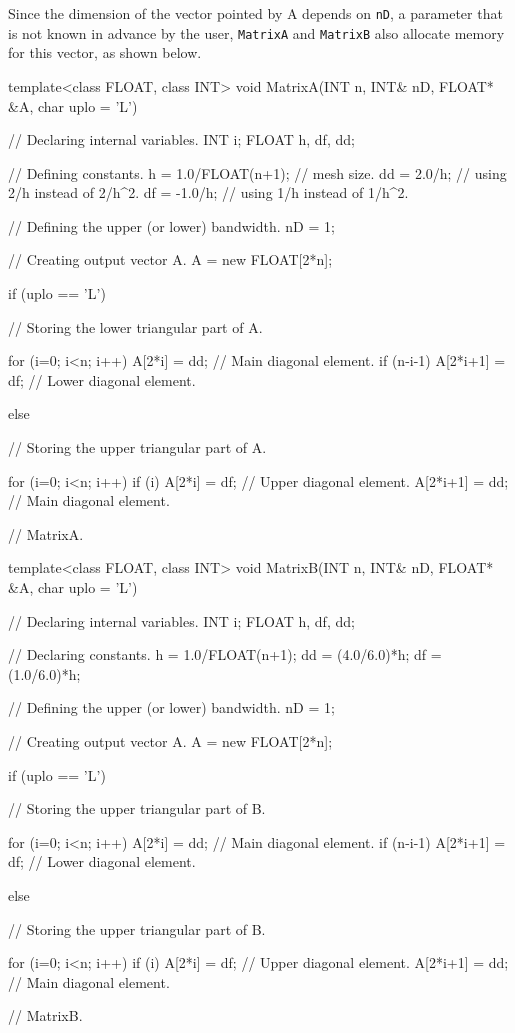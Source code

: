 Since the dimension of the vector pointed by A depends on \texttt{nD}, a parameter that is not known in advance by the user, \texttt{MatrixA} and \texttt{MatrixB} also allocate memory for this vector, as shown below.

\begin{cppcode}
template<class FLOAT, class INT>
void MatrixA(INT n, INT& nD, FLOAT* &A, char uplo = 'L')
{
	// Declaring internal variables.
	INT    i;
	FLOAT  h, df, dd;
	
	// Defining constants.
	h  = 1.0/FLOAT(n+1);   // mesh size.
	dd = 2.0/h;            // using 2/h instead of 2/h^2.
	df = -1.0/h;           // using 1/h instead of 1/h^2.
	
	// Defining the upper (or lower) bandwidth.
	nD  = 1;
	
	// Creating output vector A.
	A   = new FLOAT[2*n];
	
	if (uplo == 'L') {   // Storing the lower triangular part of A.
		
		for (i=0; i<n; i++) {
			A[2*i] = dd;                // Main diagonal element.
			if (n-i-1) A[2*i+1] = df;   // Lower diagonal element.
		}
	}
	else {               // Storing the upper triangular part of A.
		
		for (i=0; i<n; i++) {
			if (i) A[2*i]  = df;        // Upper diagonal element.
			A[2*i+1] = dd;              // Main diagonal element.
		}
	}
} // MatrixA.

template<class FLOAT, class INT>
void MatrixB(INT n, INT& nD, FLOAT* &A, char uplo = 'L')
{
	// Declaring internal variables.
	INT    i;
	FLOAT  h, df, dd;
	
	// Declaring constants.
	h  = 1.0/FLOAT(n+1);
	dd = (4.0/6.0)*h;
	df = (1.0/6.0)*h;
	
	// Defining the upper (or lower) bandwidth.
	nD  = 1;
	
	// Creating output vector A.
	A   = new FLOAT[2*n];
	
	if (uplo == 'L') {   // Storing the upper triangular part of B.
		
		for (i=0; i<n; i++) {
			A[2*i] = dd;                // Main diagonal element.
			if (n-i-1) A[2*i+1] = df;   // Lower diagonal element.
		}
	}
	else {               // Storing the upper triangular part of B.
		
		for (i=0; i<n; i++) {
			if (i) A[2*i] = df;         // Upper diagonal element.
			A[2*i+1] = dd;              // Main diagonal element.
		}
	}
} // MatrixB.
\end{cppcode}

